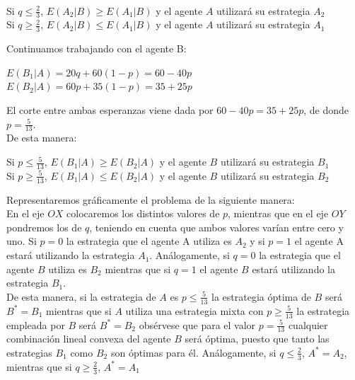 \\
\begin{center}
    Si $q\leq \frac{2}{3} $, $E(A_2|B) \geq E(A_1|B) $ y el agente $A$ utilizará su estrategia $A_2$\\
     \vspace{2mm}
    Si $q\geq \frac{2}{3} $, $E(A_2|B) \leq E(A_1|B) $ y el agente $A$ utilizará su estrategia $A_1$\\
\end{center}
Continuamos trabajando con el agente B:
\\
\begin{center}
     $E(B_1|A)=20q+60(1-p)=60-40p $ \\
    $E(B_2|A)=60p+35(1-p)=35+25p $ \\
\end{center}
El corte entre ambas esperanzas viene dada por $60-40p = 35+25p $, de donde $p=\frac{5}{13}$.
\\
De esta manera:
\\
\begin{center}
    Si $p\leq \frac{5}{13} $, $E(B_1|A) \geq E(B_2|A) $ y el agente $B$ utilizará su estrategia $B_1$\\
     \vspace{2mm}
    Si $p\geq \frac{5}{13} $, $E(B_1|A) \leq E(B_2|A) $ y el agente $B$ utilizará su estrategia $B_2$\\
\end{center}
Representaremos gráficamente el problema  de la siguiente manera:
\\
En el eje  $OX$ colocaremos los distintos valores de $p$, mientras que en el eje $OY$ pondremos los de $q$, teniendo en cuenta que ambos valores varían entre cero y uno. Si $p=0$ la estrategia que el agente A utiliza es $A_2$ y si $p=1$ el agente A estará utilizando la estrategia $A_1$. Análogamente, si $q=0$ la estrategia que el agente $B$ utiliza es $B_2$ mientras que  si $q=1$ el agente $B$ estará utilizando la estrategia $B_1$.
\\
De esta manera, si la estrategia de $A$ es $p\leq\frac{5}{13}$ la estrategia óptima de $B$ será $B^*=B_1$ mientras que si $A$ utiliza una estrategia mixta con $p\geq\frac{5}{13}$ la estrategia empleada por $B$ será $B^* = B_2$ obsérvese que para el valor $p=\frac{5}{13}$ cualquier combinación lineal convexa del agente $B$ será óptima, puesto que tanto las estrategias $B_1$ como $B_2$ son óptimas para él.
Análogamente, si $q\leq \frac{2}{3}$, $A^* = A_2$, mientras que si $q\geq\frac{2}{3}$, $A^*=A_1$ 
\\
